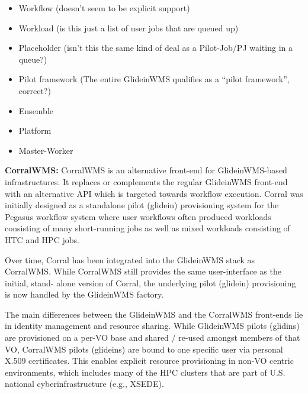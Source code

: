 \documentclass{sig-alternate}
\begin{document}
\begin{itemize}
\item Workflow (doesn't seem to be explicit support)
\item Workload (is this just a list of user jobs that are queued up)
\item Placeholder (isn't this the same kind of deal as a Pilot-Job/PJ
waiting in a queue?)
\item Pilot framework (The entire GlideinWMS qualifies as a ``pilot
framework'', correct?)
\item Ensemble 
\item Platform 
\item Master-Worker 
\end{itemize}

\textbf{CorralWMS:} CorralWMS is an alternative front-end for GlideinWMS-based
infrastructures. It replaces or complements the regular GlideinWMS front-end
with an alternative API which is targeted towards workflow execution. Corral was
initially designed as a standalone pilot (glidein) provisioning system for
the Pegasus workflow system where user  workflows often produced workloads
consisting of many short-running jobs as well as mixed workloads consisting of
HTC and HPC jobs.

Over time, Corral has been integrated into the GlideinWMS stack as CorralWMS.
While CorralWMS still provides the same user-interface as the initial, stand-
alone version of Corral, the underlying pilot (glidein) provisioning is
now handled by the GlideinWMS factory.

The main differences between the GlideinWMS and the CorralWMS front-ends lie in
identity management and resource sharing. While GlideinWMS pilots (glidins) are
provisioned on a per-VO base and shared / re-used amongst members of that VO,
CorralWMS pilots (glideins) are bound to one specific user via personal  X.509
certificates. This enables explicit resource provisioning in non-VO centric
environments, which includes many of the HPC clusters that are part of U.S.
national cyberinfrastructure (e.g., XSEDE).


%
\end{document}
